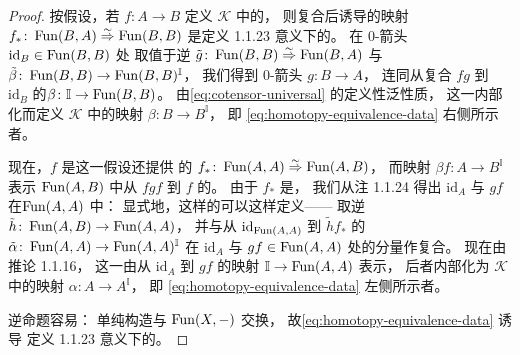 \begin{proof}
按假设，若 $f\colon A\to B$ 定义\trInfinityCosmos{} $\mathcal{K}$
中的\trEquivalence{}，
则复合后诱导的映射 $f_\ast\colon\operatorname{Fun}(B,A)\mathrel{\stackrel{\sim}{\Rightarrow}}\operatorname{Fun}(B,B)$
是定义 1.1.23 意义下\trQuasiCategory{}的\trEquivalence{}。 %
在 $0$-箭头 $\mathrm{id}_B\in\operatorname{Fun}(B,B)$ 处
取值于逆\trEquivalence{} $\tilde{g}\colon\operatorname{Fun}(B,B)\mathrel{\stackrel{\sim}{\Rightarrow}}\operatorname{Fun}(B,A)$
与\trHomotopy $\tilde{\beta}\colon\operatorname{Fun}(B,B)\to\operatorname{Fun}(B,B)^{\mathbb{I}}$，
我们得到 $0$-箭头 $g\colon B\to A$，
连同从复合 $fg$ 到 $\mathrm{id}_B$
的\trIsomorphism $\beta\colon\mathbb{I}\to\operatorname{Fun}(B,B)$。
由\trCotensor \eqref{eq:cotensor-universal} 的定义性泛性质，
这一\trIsomorphism{}内部化而定义 $\mathcal{K}$ 中的映射
$\beta\colon B\to B^{\mathbb{I}}$，
即 \eqref{eq:homotopy-equivalence-data} 右侧所示者。

现在，$f$ 是\trEquivalence{}这一假设还提供%
\trQuasiCategory{}的\trEquivalence{} $f_\ast\colon\operatorname{Fun}(A,A)\mathrel{\stackrel{\sim}{\Rightarrow}}\operatorname{Fun}(A,B)$，
而映射 $\beta f\colon A\to B^{\mathbb{I}}$
表示 $\operatorname{Fun}(A,B)$ 中从 $fgf$ 到 $f$ 的\trIsomorphism{}。
由于 $f_\ast$ 是\trEquivalence{}，
我们从注 1.1.24 得出 $\mathrm{id}_A$ 与 $gf$
在\trQuasiCategory $\operatorname{Fun}(A,A)$ 中\trIsomorphism{}：
显式地，这样的\trIsomorphism{}可以这样定义——
取逆\trEquivalence{} $\tilde{h}\colon\operatorname{Fun}(A,B)\to\operatorname{Fun}(A,A)$，
并与从 $\mathrm{id}_{\operatorname{Fun}(A,A)}$ 到 $\tilde{h}f_\ast$
的\trIsomorphism $\tilde{\alpha}\colon\operatorname{Fun}(A,A)\to\operatorname{Fun}(A,A)^{\mathbb{I}}$
在 $\mathrm{id}_A$ 与 $gf\in\operatorname{Fun}(A,A)$ 处的分量作复合。
现在由推论 1.1.16，
这一\trIsomorphism{}由从 $\mathrm{id}_A$ 到 $gf$ 的映射
$\mathbb{I}\to\operatorname{Fun}(A,A)$ 表示，
后者内部化为 $\mathcal{K}$ 中的映射 $\alpha\colon A\to A^{\mathbb{I}}$，
即 \eqref{eq:homotopy-equivalence-data} 左侧所示者。

逆命题容易：
单纯\trCotensor{}构造与 $\operatorname{Fun}(X,-)$ 交换，
故\trHomotopyEquivalence \eqref{eq:homotopy-equivalence-data} 诱导
定义 1.1.23 意义下\trQuasiCategory{}的\trHomotopyEquivalence{}。 %
\end{proof}

